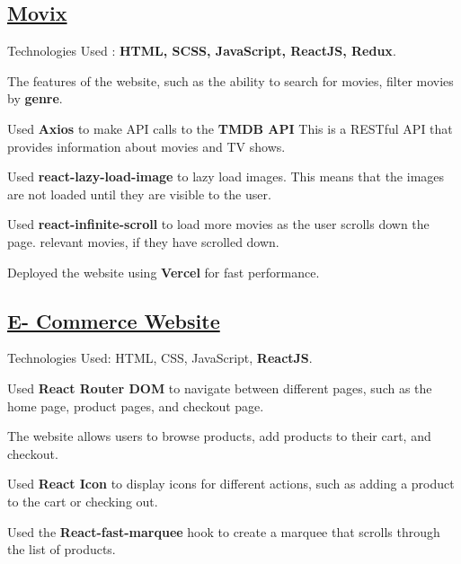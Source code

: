 \subsection{{\href{https://movix-tejasvi8686.vercel.app/}{Movix} }}
\begin{zitemize}
\item Technologies Used : \textbf{HTML, SCSS, JavaScript, ReactJS, Redux}.
\item The features of the website, such as the ability to search for movies, filter movies by \textbf{genre}.
\item Used \textbf{Axios} to make API calls to the \textbf{TMDB API} This is a RESTful API that provides information about movies and TV shows.
\item Used \textbf {react-lazy-load-image} to lazy load images. This means that the images are not loaded until they are visible to the user.
\item Used \textbf{react-infinite-scroll} to load more movies as the user scrolls down the page. relevant movies, if they have scrolled down.
\item Deployed the website using \textbf{Vercel} for fast performance.
\end{zitemize}


\subsection{{\href{https://tejasviapneck.netlify.app/}{E- Commerce Website} \hfill }}
\begin{zitemize}
\item Technologies Used: HTML, CSS, JavaScript, 
  {\textbf{ReactJS}}.
\item Used \textbf{React Router DOM} to navigate between different pages, such as the home page, product pages, and checkout page.
\item The website allows users to browse products, add products to their cart, and checkout.
\item Used \textbf{React Icon} to display icons for different actions, such as adding a product to the cart or checking out.
\item  Used the \textbf{React-fast-marquee} hook to create a marquee that scrolls through the list of products.
\end{zitemize}

